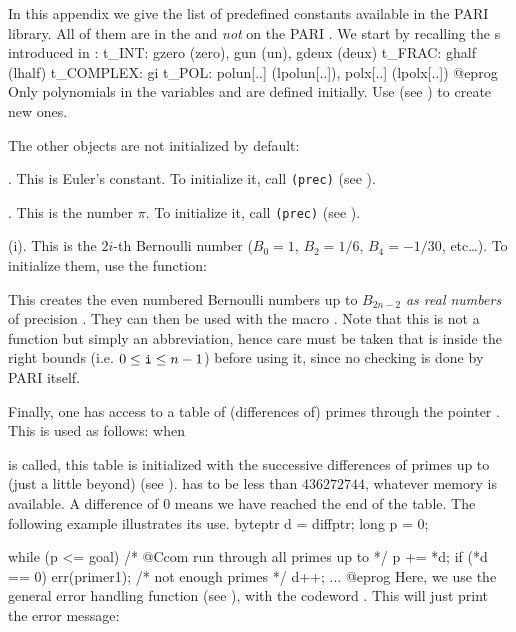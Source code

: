 
In this appendix we give the list of predefined constants available in the
PARI library. All of them are in the  and {\it not\/} on the PARI
. We start by recalling the s introduced in
:
%
\bprog
t_INT: gzero (zero), gun (un), gdeux (deux)
t_FRAC: ghalf (lhalf)
t_COMPLEX: gi
t_POL: polun[..] (lpolun[..]), polx[..] (lpolx[..])
@eprog
\noindent Only polynomials in the variables  and  are
defined initially. Use  (see ) to
create new ones.

\noindent The other objects are not initialized by default:

. This is Euler's constant. To initialize it, call
{\tt{}(prec)} (see ).

. This is the number $\pi$. To initialize it, call
{\tt{}(prec)} (see ).

(i). This is the $2i$-th Bernoulli number ($B_0=1$, $B_2=1/6$,
$B_4=-1/30$, etc\dots). To initialize them, use the function:


This creates the even numbered Bernoulli numbers up to $B_{2n-2}$ {\it as
real numbers\/} of precision . They can then be used with the macro
. Note that this is not a function but simply an abbreviation,
hence care must be taken that  is inside the right bounds (i.e. $0\le
{\tt i}\le n-1$) before using it, since no checking is done by PARI itself.

Finally, one has access to a table of (differences of) primes through the
pointer . This is used as follows: when


\noindent is called, this table is initialized with the successive
differences of primes up to (just a little beyond) 
(see ).  has to be less than $436272744$,
whatever memory is available. A
difference of $0$ means we have reached the end of the table. The following
example illustrates its use.
%
\bprog
byteptr d = diffptr;
long p = 0;

while (p <= goal) /* @Ccom run through all primes up to  */
{
  p += *d;
  if (*d == 0) err(primer1); /* {\rm not enough primes} */
  d++;
  ...
}
@eprog\noindent
Here, we use the general error handling function  (see
), with the codeword . This will just print
the error message:

